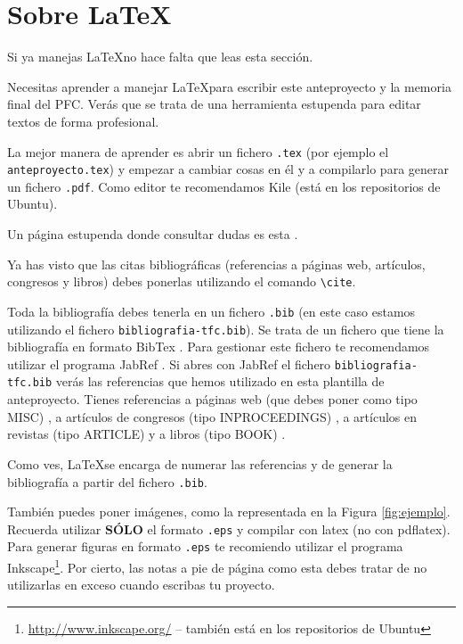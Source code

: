 \documentclass[12pt,oneside,a4paper]{article}
\begin{document}

\section{Sobre \LaTeX}

Si ya manejas \LaTeX no hace falta que leas esta sección.

Necesitas aprender a manejar \LaTeX para escribir este anteproyecto y la memoria final del PFC. Verás que se trata de una herramienta estupenda para editar textos de forma profesional.

La mejor manera de aprender es abrir un fichero \verb$.tex$ (por ejemplo el \verb$anteproyecto.tex$) y empezar a cambiar cosas en él y a compilarlo para generar un fichero \verb$.pdf$. Como editor te recomendamos Kile \cite{kile} (está en los repositorios de Ubuntu).

Un página estupenda donde consultar dudas es esta \cite{wikibook}.

Ya has visto que las citas bibliográficas (referencias a páginas web, artículos, congresos y libros) debes ponerlas utilizando el comando \verb$\cite$.

Toda la bibliografía debes tenerla en un fichero \verb$.bib$ (en este caso estamos utilizando el fichero \verb$bibliografia-tfc.bib$). Se trata de un fichero que tiene la bibliografía en formato BibTex \cite{bibtex}. Para gestionar este fichero te recomendamos utilizar el programa JabRef \cite{jabref}. Si abres con JabRef el fichero \verb$bibliografia-tfc.bib$ verás las referencias que hemos utilizado en esta plantilla de anteproyecto. Tienes referencias a páginas web (que debes poner como tipo MISC) \cite{bibtex,jabref,wikibook}, a artículos de congresos (tipo INPROCEEDINGS) \cite{Lowe1999}, a artículos en revistas (tipo ARTICLE) \cite{Tuytelaars2008} y a libros (tipo BOOK) \cite{hartley2006}.

Como ves, \LaTeX se encarga de numerar las referencias y de generar la bibliografía a partir del fichero \verb$.bib$.

También puedes poner imágenes, como la representada en la Figura \ref{fig:ejemplo}. Recuerda utilizar \textbf{SÓLO} el formato \verb$.eps$ y compilar con latex (no con pdflatex). Para generar figuras en formato \verb$.eps$ te recomiendo utilizar el programa Inkscape\footnote{\url{http://www.inkscape.org/} -- también está en los repositorios de Ubuntu}. Por cierto, las notas a pie de página como esta debes tratar de no utilizarlas en exceso cuando escribas tu proyecto.
\end{document}
